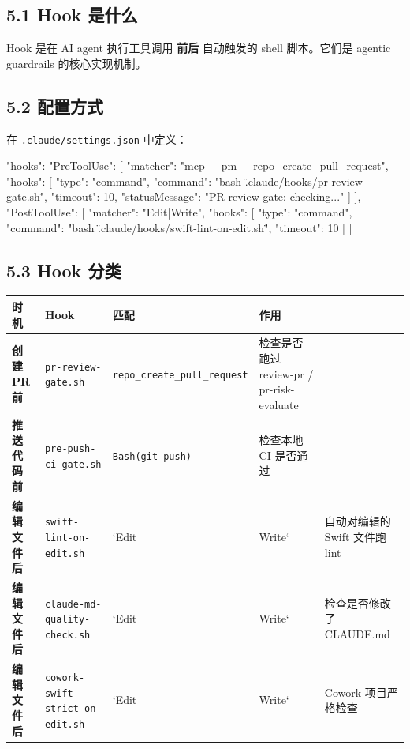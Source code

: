 \subsection{5.1 Hook 是什么}

Hook 是在 AI agent 执行工具调用 \textbf{前后} 自动触发的 shell 脚本。它们是 agentic guardrails 的核心实现机制。


\subsection{5.2 配置方式}

在 \texttt{.claude/settings.json} 中定义：


\begin{codeblock}
{
  "hooks": {
    "PreToolUse": [
      {
        "matcher": "mcp__pm__repo_create_pull_request",
        "hooks": [
          {
            "type": "command",
            "command": "bash \".claude/hooks/pr-review-gate.sh\"",
            "timeout": 10,
            "statusMessage": "PR-review gate: checking..."
          }
        ]
      }
    ],
    "PostToolUse": [
      {
        "matcher": "Edit|Write",
        "hooks": [
          {
            "type": "command",
            "command": "bash \".claude/hooks/swift-lint-on-edit.sh\"",
            "timeout": 10
          }
        ]
      }
    ]
  }
}
\end{codeblock}

\subsection{5.3 Hook 分类}

\begingroup
\scriptsize
\setlength{\tabcolsep}{3pt}
\begin{longtable}{|p{}|p{}|p{}|p{}|p{}|}
\hline
时机 & Hook & 匹配 & 作用 &  \\ \hline
\textbf{创建 PR 前} & \texttt{pr-review-gate.sh} & \texttt{repo\_create\_pull\_request} & 检查是否跑过 review-pr / pr-risk-evaluate &  \\ \hline
\textbf{推送代码前} & \texttt{pre-push-ci-gate.sh} & \texttt{Bash(git push)} & 检查本地 CI 是否通过 &  \\ \hline
\textbf{编辑文件后} & \texttt{swift-lint-on-edit.sh} & `Edit\ & Write` & 自动对编辑的 Swift 文件跑 lint \\ \hline
\textbf{编辑文件后} & \texttt{claude-md-quality-check.sh} & `Edit\ & Write` & 检查是否修改了 CLAUDE.md \\ \hline
\textbf{编辑文件后} & \texttt{cowork-swift-strict-on-edit.sh} & `Edit\ & Write` & Cowork 项目严格检查 \\ \hline
\end{longtable}
\endgroup

